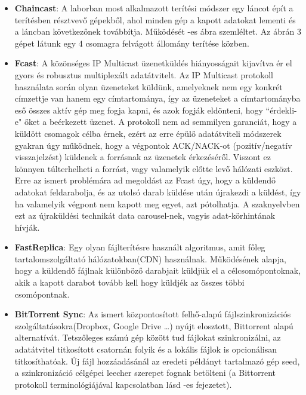 \begin{itemize}
  \item \textbf{Chaincast}: A laborban most alkalmazott terítési módszer egy láncot épít a terítésben résztvevő gépekből, ahol minden gép a kapott adatokat lementi és a láncban következőnek továbbítja. Működését -es ábra szemléltet. Az ábrán 3 gépet látunk egy 4 csomagra felvágott állomány terítése közben.
  \item \textbf{Fcast}\cite{gemmell2000fcast}: A közönséges IP Multicast üzenetküldés hiányosságait kijavítva ér el gyors és robusztus multiplexált adatátvitelt. Az IP Multicast protokoll használata során olyan üzeneteket küldünk, amelyeknek nem egy konkrét címzettje van hanem egy címtartománya, így az üzeneteket a címtartományba eső összes aktív gép meg fogja kapni, és azok fogják eldönteni, hogy ``érdekli-e" őket a beérkezett üzenet. A protokoll nem ad semmilyen garanciát, hogy a küldött csomagok célba érnek, ezért az erre épülő adatátviteli módszerek gyakran úgy működnek, hogy a végpontok ACK/NACK-ot (pozitív/negatív visszajelzést) küldenek a forrásnak az üzenetek érkezéséről. Viszont ez könnyen túlterhelheti a forrást, vagy valamelyik előtte levő hálózati eszközt. Erre az ismert problémára ad megoldást az Fcast úgy, hogy a küldendő adatokat feldarabolja, és az utolsó darab küldése után újrakezdi a küldést, így ha valamelyik végpont nem kapott meg egyet, azt pótolhatja. A szaknyelvben ezt az újraküldési technikát data carousel-nek, vagyis adat-körhintának hívják.
  \item \textbf{FastReplica}\cite{cherkasova2003fastreplica}:  Egy olyan fájlterítésre használt algoritmus, amit főleg tartalomszolgáltató hálózatokban(CDN) használnak. Működésének alapja, hogy a küldendő fájlnak különböző darabjait küldjük el a célcsomópontoknak, akik a kapott darabot tovább kell hogy küldjék az összes többi csomópontnak.
  \item \textbf{BitTorrent Sync}\cite{farina2014bittorrent}: Az ismert központosított felhő-alapú fájlszinkronizációs szolgáltatásokra(Dropbox, Google Drive \ldots) nyújt elosztott, Bittorrent alapú alternatívát. Tetszőleges számú gép között tud fájlokat szinkronizálni, az adatátvitel titkosított csatornán folyik és a lokális fájlok is opcionálisan titkosíthatóak. Új fájl hozzáadásánál az eredeti példányt tartalmazó gép seed, a szinkronizáció célgépei leecher szerepet fognak betölteni (a Bittorrent protokoll terminológiájával kapcsolatban lásd -es fejezetet).
\end{itemize}

